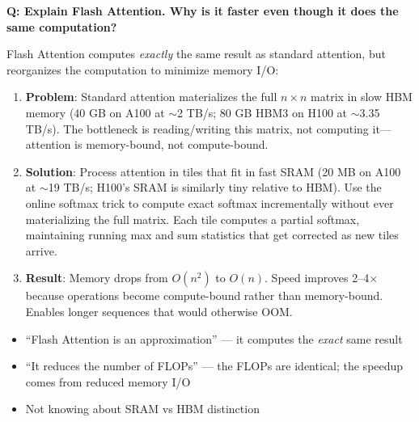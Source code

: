 \begin{interviewq}
\textbf{Q: Explain Flash Attention. Why is it faster even though it does the same computation?}

 \quad {} \quad \badgefreq{\freqhigh}

\stronganswer Flash Attention computes \textit{exactly} the same result as standard attention, but reorganizes the computation to minimize memory I/O:

\begin{enumerate}
    \item \textbf{Problem}: Standard attention materializes the full $n \times n$ matrix in slow HBM memory (40 GB on A100 at $\sim$2 TB/s; 80 GB HBM3 on H100 at $\sim$3.35 TB/s). The bottleneck is reading/writing this matrix, not computing it---attention is memory-bound, not compute-bound.
    \item \textbf{Solution}: Process attention in tiles that fit in fast SRAM (20 MB on A100 at $\sim$19 TB/s; H100's SRAM is similarly tiny relative to HBM). Use the online softmax trick to compute exact softmax incrementally without ever materializing the full matrix. Each tile computes a partial softmax, maintaining running max and sum statistics that get corrected as new tiles arrive.
    \item \textbf{Result}: Memory drops from $O(n^2)$ to $O(n)$. Speed improves 2--4$\times$ because operations become compute-bound rather than memory-bound. Enables longer sequences that would otherwise OOM.
\end{enumerate}

\redflags
\begin{itemize}
    \item ``Flash Attention is an approximation'' --- it computes the \textit{exact} same result
    \item ``It reduces the number of FLOPs'' --- the FLOPs are identical; the speedup comes from reduced memory I/O
    \item Not knowing about SRAM vs HBM distinction
\end{itemize}



\end{interviewq}
